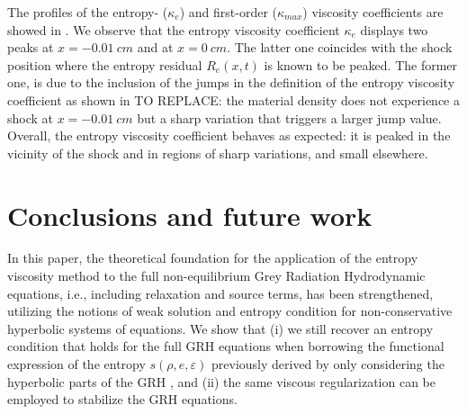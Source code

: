 \documentclass[times,doublespace]{fldauth}%
\begin{document}
%
The profiles of the entropy- ($\kappa_e$) and first-order ($\kappa_{max}$) viscosity coefficients are showed in . We observe that the entropy viscosity coefficient $\kappa_e$ displays two peaks at $x=-0.01 \ cm$ and at $x = 0 \ cm$. The latter one coincides with the shock position where the entropy residual $R_e(x,t)$ is known to be peaked. %
The former one, is due to the inclusion of the jumps in the definition of the entropy viscosity coefficient as shown in TO REPLACE: the material density does not experience a shock at $x=-0.01 \ cm$ but a sharp variation that triggers a larger  jump value. 
Overall, the entropy viscosity coefficient behaves as expected: it is peaked in the vicinity of the shock and in regions of sharp variations, and small elsewhere.
%
\section{Conclusions and future work}
In this paper, the theoretical foundation for the application of the entropy viscosity method to the full non-equilibrium Grey Radiation Hydrodynamic equations, i.e., including relaxation and source terms, has been strengthened, utilizing the notions of weak solution and entropy condition for non-conservative hyperbolic systems of equations. We show that 
(i) we still recover an entropy condition that holds for the full GRH equations when borrowing the functional expression of the entropy  $s(\rho,e,\varepsilon)$ previously derived by only considering the hyperbolic parts of the GRH \cite{our_jcp_radhy_paper}, and
(ii) the same viscous regularization can be employed to stabilize the GRH equations.
\end{document}
